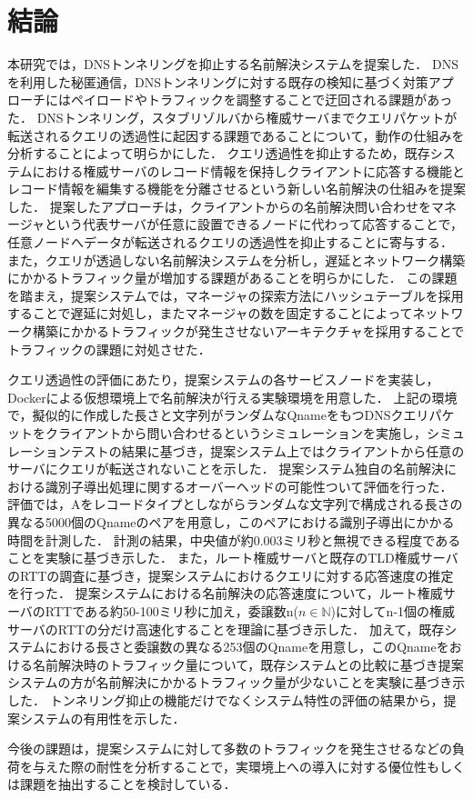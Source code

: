 \section{結論}
\label{sec:conclusion}
本研究では，DNSトンネリングを抑止する名前解決システムを提案した．
DNSを利用した秘匿通信，DNSトンネリングに対する既存の検知に基づく対策アプローチにはペイロードやトラフィックを調整することで迂回される課題があった．
DNSトンネリング，スタブリゾルバから権威サーバまでクエリパケットが転送されるクエリの透過性に起因する課題であることについて，動作の仕組みを分析することによって明らかにした．
クエリ透過性を抑止するため，既存システムにおける権威サーバのレコード情報を保持しクライアントに応答する機能とレコード情報を編集する機能を分離させるという新しい名前解決の仕組みを提案した．
提案したアプローチは，クライアントからの名前解決問い合わせをマネージャという代表サーバが任意に設置できるノードに代わって応答することで，任意ノードへデータが転送されるクエリの透過性を抑止することに寄与する．
また，クエリが透過しない名前解決システムを分析し，遅延とネットワーク構築にかかるトラフィック量が増加する課題があることを明らかにした．
この課題を踏まえ，提案システムでは，マネージャの探索方法にハッシュテーブルを採用することで遅延に対処し，またマネージャの数を固定することによってネットワーク構築にかかるトラフィックが発生させないアーキテクチャを採用することでトラフィックの課題に対処させた．

クエリ透過性の評価にあたり，提案システムの各サービスノードを実装し，Dockerによる仮想環境上で名前解決が行える実験環境を用意した．
上記の環境で，擬似的に作成した長さと文字列がランダムなQnameをもつDNSクエリパケットをクライアントから問い合わせるというシミュレーションを実施し，シミュレーションテストの結果に基づき，提案システム上ではクライアントから任意のサーバにクエリが転送されないことを示した．
提案システム独自の名前解決における識別子導出処理に関するオーバーヘッドの可能性ついて評価を行った．
評価では，Aをレコードタイプとしながらランダムな文字列で構成される長さの異なる5000個のQnameのペアを用意し，このペアにおける識別子導出にかかる時間を計測した．
計測の結果，中央値が約0.003ミリ秒と無視できる程度であることを実験に基づき示した．
また，ルート権威サーバと既存のTLD権威サーバのRTTの調査に基づき，提案システムにおけるクエリに対する応答速度の推定を行った．
提案システムにおける名前解決の応答速度について，ルート権威サーバのRTTである約50-100ミリ秒に加え，委譲数n($n \in \mathbb{N}$)に対してn-1個の権威サーバのRTTの分だけ高速化することを理論に基づき示した．
加えて，既存システムにおける長さと委譲数の異なる253個のQnameを用意し，このQnameをおける名前解決時のトラフィック量について，既存システムとの比較に基づき提案システムの方が名前解決にかかるトラフィック量が少ないことを実験に基づき示した．
トンネリング抑止の機能だけでなくシステム特性の評価の結果から，提案システムの有用性を示した．

今後の課題は，提案システムに対して多数のトラフィックを発生させるなどの負荷を与えた際の耐性を分析することで，実環境上への導入に対する優位性もしくは課題を抽出することを検討している．
